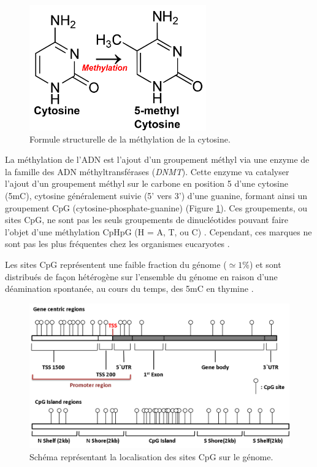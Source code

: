 \documentclass[11pt,a4paper,notrimn]{krantz}
\theoremstyle{definition}
\theoremstyle{definition}
\theoremstyle{remark}
\begin{document}
\begin{figure}[!htb]

{\centering \includegraphics[width=3in]{FiguresTables/cytosine} 

}

\caption{Formule structurelle de la méthylation de la cytosine.}\label{fig:cytosine}
\end{figure}

La méthylation de l'ADN est l'ajout d'un groupement méthyl via une
enzyme de la famille des ADN méthyltransférases (\emph{DNMT}). Cette
enzyme va catalyser l'ajout d'un groupement méthyl sur le carbone en
position 5 d'une cytosine (5mC), cytosine généralement suivie (5' vers
3') d'une guanine, formant ainsi un groupement CpG
(cytosine-phosphate-guanine) (Figure \ref{fig:cytosine}). Ces
groupements, ou sites CpG, ne sont pas les seuls groupements de
dinucléotides pouvant faire l'objet d'une méthylation CpHpG (H = A, T,
ou C) \citep{lister_human_2009}. Cependant, ces marques ne sont pas les
plus fréquentes chez les organismes eucaryotes \citep{bird_dna_1980}.

Les sites CpG représentent une faible fraction du génome
(\(\simeq 1 \%\)) et sont distribués de façon hétérogène sur l'ensemble
du génome en raison d'une déamination spontanée, au cours du temps, des
5mC en thymine \citep{bird_dna_1980, cooper_cytosine_1989}.




\begin{figure}[!htb]

{\centering \includegraphics[width=6in]{FiguresTables/CpG} 

}

\caption{Schéma représentant la localisation des sites CpG sur le
génome.}\label{fig:CpG}
\end{figure}
\end{document}
